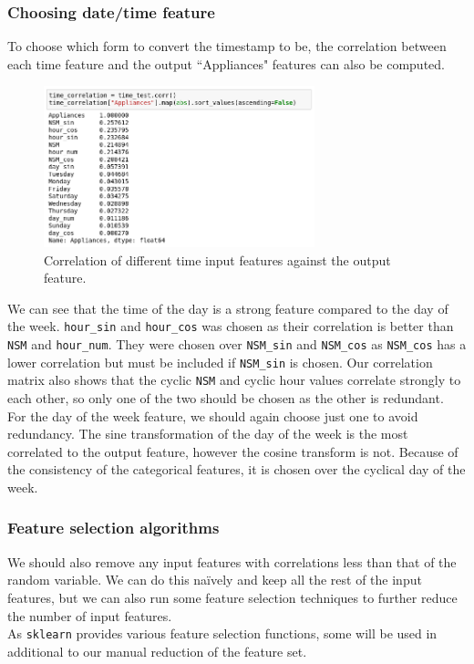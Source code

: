 \documentclass{article}
\newcommand{\n}[0]{\\[\baselineskip]}
\begin{document}
\subsubsection{Choosing date/time feature}
To choose which form to convert the timestamp to be, the correlation between each time feature and the output ``Appliances" features can also be computed. 
\begin{figure}[H]
\centering
\includegraphics[width=0.7\textwidth, keepaspectratio]{imgs/time-correlation.png}
\caption{Correlation of different time input features against the output feature.}
\end{figure}
\noindent
We can see that the time of the day is a strong feature compared to the day of the week.  \texttt{hour\_sin} and \texttt{hour\_cos} was chosen as their correlation is better than \texttt{NSM} and \texttt{hour\_num}. They were chosen over \texttt{NSM\_sin} and \texttt{NSM\_cos} as \texttt{NSM\_cos} has a lower correlation but must be included if \texttt{NSM\_sin} is chosen. Our correlation matrix also shows that the cyclic \texttt{NSM} and cyclic hour values correlate strongly to each other, so only one of the two should be chosen as the other is redundant. 
\n
For the day of the week feature, we should again choose just one to avoid redundancy. The sine transformation of the day of the week is the most correlated to the output feature, however the cosine transform is not. Because of the consistency of the categorical features, it is chosen over the cyclical day of the week. 

\subsubsection{Feature selection algorithms}
We should also remove any input features with correlations less than that of the random variable. We can do this na\"{i}vely and keep all the rest of the input features, but we can also run some feature selection techniques to further reduce the number of input features.
\n
As \texttt{sklearn} provides various feature selection functions, some will be used in additional to our manual reduction of the feature set. 
\end{document}
